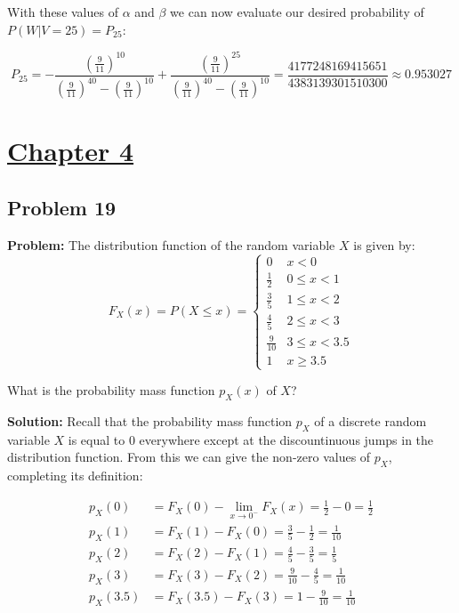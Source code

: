\documentclass{article}
\begin{document}
With these values of $\alpha$ and $\beta$ we can now evaluate our desired probability of $P(W|V=25)=P_{25}$:

\begin{equation*}
    P_{25}=-\frac{\left(\frac{9}{11}\right)^{10}}{\left(\frac{9}{11}\right)^{40}-\left(\frac{9}{11}\right)^{10}}+\frac{\left(\frac{9}{11}\right)^{25}}{\left(\frac{9}{11}\right)^{40}-\left(\frac{9}{11}\right)^{10}}=\frac{4177248169415651}{4383139301510300}\approx0.953027
\end{equation*}

\section*{\underline{Chapter 4}}

\subsection*{Problem 19}
\noindent\textbf{Problem:} The distribution function of the random variable $X$ is given by:
\[F_X(x)=P(X\le x)=\begin{cases} 
    0 & x< 0 \\
    \frac{1}{2} & 0\leq x<1 \\
    \frac{3}{5} & 1\leq x<2 \\
    \frac{4}{5} & 2\leq x<3 \\
    \frac{9}{10} & 3\leq x<3.5 \\
    1 & x\ge3.5 
 \end{cases}
\]

What is the probability mass function $p_X(x)$ of $X$?
\bigskip

\noindent\textbf{Solution:} Recall that the probability mass function $p_X$ of a discrete random variable $X$ is equal to 0 everywhere except at the discountinuous jumps in the distribution function. From this we can give the non-zero values of $p_X$, completing its definition:

\begin{align*}
    p_X(0)&=F_X(0)-\lim_{x\to 0^-}F_X(x)=\frac{1}{2}-0=\frac{1}{2}\\
    p_X(1)&=F_X(1)-F_X(0)=\frac{3}{5}-\frac{1}{2}=\frac{1}{10}\\
    p_X(2)&=F_X(2)-F_X(1)=\frac{4}{5}-\frac{3}{5}=\frac{1}{5}\\
    p_X(3)&=F_X(3)-F_X(2)=\frac{9}{10}-\frac{4}{5}=\frac{1}{10}\\
    p_X(3.5)&=F_X(3.5)-F_X(3)=1-\frac{9}{10}=\frac{1}{10}
\end{align*}
\end{document}
